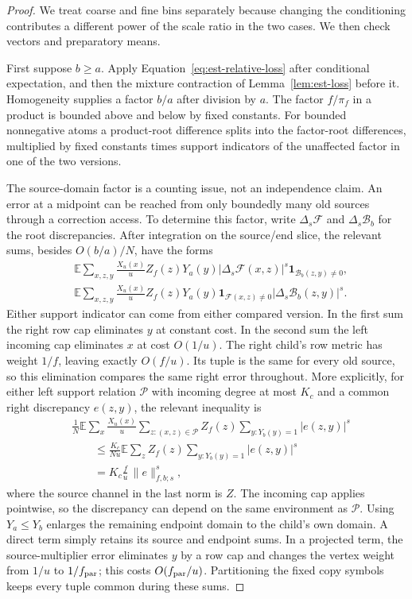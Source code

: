 \begin{proof}
We treat coarse and fine bins separately because changing the conditioning contributes a different power of the scale ratio in the two cases. We then check vectors and preparatory means.

First suppose $b\ge a$.  Apply
Equation~\eqref{eq:est-relative-loss} after conditional expectation, and
then the mixture contraction of Lemma~\ref{lem:est-loss} before it.
Homogeneity supplies a factor $b/a$ after division by $a$.
The factor $f/\pi_f$ in a product is bounded above and below by fixed
constants.  For bounded nonnegative atoms a product-root difference splits
into the factor-root differences, multiplied by fixed constants times
support indicators of the unaffected factor in one of the two versions.

The source-domain factor is a counting issue, not an independence claim. An error at a midpoint can be reached from only boundedly many old sources through a correction access. To determine this factor, write
$\Delta_s\mathcal F$ and $\Delta_s\mathcal B_b$ for the root discrepancies.
After integration on the source/end slice, the relevant sums, besides
$O(b/a)/N$, have the forms
\begin{align*}
 &\mathbb E\sum_{x,z,y}\frac{X_u(x)}u Z_f(z)Y_a(y)
       |\Delta_s\mathcal F(x,z)|^s
       \mathbf1_{\mathcal B_b(z,y)\ne0},\\
 &\mathbb E\sum_{x,z,y}\frac{X_u(x)}u Z_f(z)Y_a(y)
       \mathbf1_{\mathcal F(x,z)\ne0}
       |\Delta_s\mathcal B_b(z,y)|^s.
\end{align*}
Either support indicator can come from either compared version.  In the
first sum the right row cap eliminates $y$ at constant cost.  In the
second sum the left incoming cap eliminates $x$ at cost $O(1/u)$.
The right child's row metric has weight $1/f$, leaving exactly $O(f/u)$.
Its tuple is the same for every old source, so this elimination compares
the same right error throughout.  More explicitly, for either left
support relation $\mathcal P$ with incoming degree at most $K_c$ and
a common right discrepancy $e(z,y)$, the relevant inequality is
\begin{align*}
 &\frac1N\mathbb E\sum_x\frac{X_u(x)}u
       \sum_{z:(x,z)\in\mathcal P}Z_f(z)
       \sum_{y:Y_b(y)=1}|e(z,y)|^s\\
 &\qquad\leq \frac{K_c}{Nu}\mathbb E\sum_z Z_f(z)
       \sum_{y:Y_b(y)=1}|e(z,y)|^s\\
 &\qquad=K_c\frac fu\,\|e\|_{f,b;s}^s,
\end{align*}
where the source channel in the last norm is $Z$.
The incoming cap applies pointwise, so the discrepancy can depend on
the same environment as $\mathcal P$.
Using $Y_a\le Y_b$ enlarges the remaining
endpoint domain to the child's own domain.  A direct term simply retains
its source and endpoint sums.  In a projected term, the source-multiplier
error eliminates $y$ by a row cap and changes the vertex weight from
$1/u$ to $1/f_{\rm par}$; this costs $O(f_{\rm par}/u)$.
Partitioning the fixed copy symbols keeps every tuple common during these
sums.


\end{proof}
